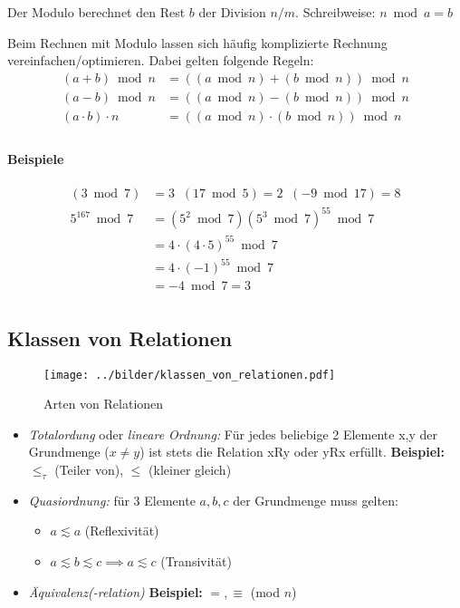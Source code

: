 Der Modulo berechnet den Rest $b$ der Division $n/m$. Schreibweise: $n \bmod a = b$

Beim Rechnen mit Modulo lassen sich häufig komplizierte Rechnung
vereinfachen/optimieren. Dabei gelten folgende Regeln:
\begin{align*}
  (a+b) \bmod n       &= ((a \bmod n) + (b \bmod n)) \bmod n \\
  (a-b) \bmod n       &= ((a \bmod n) - (b \bmod n)) \bmod n \\
  (a \cdot b) \cdot n &= ((a \bmod n) \cdot (b \bmod n)) \bmod n \\
\end{align*}

\paragraph{Beispiele}
\begin{align*}
  (3 \bmod 7)&= 3   \;\;   (17 \bmod 5)= 2   \;\;    (-9 \bmod 17)= 8 \\
  5^{167} \bmod 7 &= (5^2 \bmod 7) (5^3 \bmod 7)^{55} \bmod 7 \\
                 &= 4 \cdot (4 \cdot 5)^{55} \bmod 7 \\
                 &= 4 \cdot (-1)^{55} \bmod 7\\
                 &= -4 \bmod 7 = 3\\
\end{align*}

\subsection{Klassen von Relationen}

\begin{figure}[h]
  \texttt{[image: ../bilder/klassen\_von\_relationen.pdf]}
  \caption{Arten von Relationen}
\end{figure}

\begin{itemize}
\item \emph{Totalordung} oder \emph{lineare Ordnung:} Für jedes
  beliebige 2 Elemente x,y der Grundmenge ($x \ne y$) ist stets die
  Relation xRy oder yRx erfüllt. \textbf{Beispiel:} $\le_\tau$ (Teiler
  von), $\le$ (kleiner gleich)
\item \emph{Quasiordnung:} für 3 Elemente $a,b,c$ der Grundmenge muss gelten:
  \begin{itemize}
  \item $a\lesssim a$ (Reflexivität)
  \item $a\lesssim b\lesssim c \implies a \lesssim c$ (Transivität)
  \end{itemize}
\item \emph{Äquivalenz(-relation)}  \textbf{Beispiel:} $=, \equiv$ (mod $n$)
\end{itemize}

